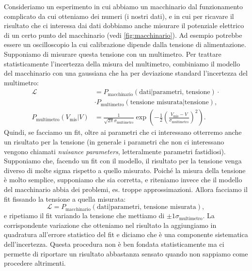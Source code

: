 \begin{example}
	Consideriamo un esperimento in cui abbiamo un macchinario dal funzionamento complicato
	da cui otteniamo dei numeri (i nostri dati),
	e in cui per ricavare il risultato che ci interessa dai dati
	dobbiamo anche misurare il potenziale elettrico di un certo punto del macchinario
	(vedi \autoref{fig:macchinario}).
	Ad esempio potrebbe essere un oscilloscopio la cui calibrazione dipende dalla tensione di alimentazione.
	Supponiamo di misurare questa tensione con un multimetro.
	Per trattare statisticamente l'incertezza della misura del multimetro,
	combiniamo il modello del macchinario con una gaussiana
	che ha per deviazione standard l'incertezza del multimetro:
	\begin{align*}
		\mathcal L
		&= P_\text{macchinario}(\text{dati}|\text{parametri, tensione}) \cdot \\
		&\cdot P_\text{multimetro}(\text{tensione misurata}|\text{tensione}), \\
		P_\text{multimetro}(V_\text{mis}|V)
		&= \frac 1 {\sqrt{2\pi}\sigma_\text{multimetro}}
		\exp \left( -\frac12 \left( \frac{V_\text{mis} - V} {\sigma_\text{multimetro}} \right)^2 \right).
	\end{align*}
	Quindi, se facciamo un fit, oltre ai parametri che ci interessano
	otterremo anche un risultato per la tensione
	(in generale i parametri che non ci interessano vengono chiamati \emph{nuisance parameters},
	letteralmente parametri fastidiosi).
	Supponiamo che, facendo un fit con il modello,
	il risultato per la tensione venga diverso di molte sigma rispetto a quello misurato.
	Poiché la misura della tensione è molto semplice,
	supponiamo che sia corretta,
	e riteniamo invece che il modello del macchinario abbia dei problemi, es. troppe approssimazioni.
	Allora facciamo il fit fissando la tensione a quella misurata:
	\begin{equation*}
		\mathcal L = P_\text{macchinario}(\text{dati}|\text{parametri, tensione misurata}),
	\end{equation*}
	e ripetiamo il fit variando la tensione che mettiamo di $\pm 1\sigma_\text{multimetro}$.
	La corrispondente variazione che otteniamo nel risultato la aggiungiamo in quadratura all'errore
	statistico del fit e diciamo che è una componente sistematica dell'incertezza.
	Questa procedura non è ben fondata statisticamente ma ci permette di riportare un risultato
	abbastanza sensato quando non sappiamo come procedere altrimenti.
\end{example}


